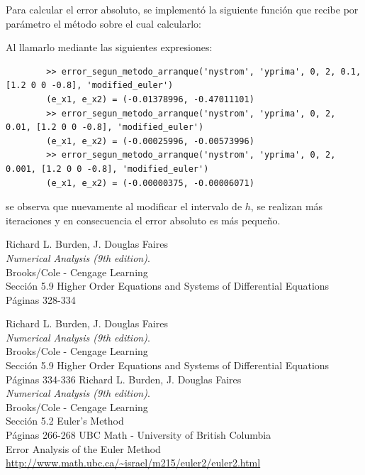 \documentclass[titlepage,a4paper]{article}
\begin{document}
	Para calcular el error absoluto, se implementó la siguiente función que recibe por parámetro el método sobre el cual calcularlo:
	

	Al llamarlo mediante las siguientes expresiones:

	\begin{lstlisting}
		>> error_segun_metodo_arranque('nystrom', 'yprima', 0, 2, 0.1, [1.2 0 0 -0.8], 'modified_euler')
		(e_x1, e_x2) = (-0.01378996, -0.47011101)
		>> error_segun_metodo_arranque('nystrom', 'yprima', 0, 2, 0.01, [1.2 0 0 -0.8], 'modified_euler')
		(e_x1, e_x2) = (-0.00025996, -0.00573996)
		>> error_segun_metodo_arranque('nystrom', 'yprima', 0, 2, 0.001, [1.2 0 0 -0.8], 'modified_euler')
		(e_x1, e_x2) = (-0.00000375, -0.00006071)
	\end{lstlisting}

	se observa que nuevamente al modificar el intervalo de $ h $, se realizan más iteraciones y en consecuencia el error absoluto es más pequeño.


\begin{thebibliography}{9} 
		Richard L. Burden, J. Douglas Faires\\
		\textit{Numerical Analysis (9th edition)}. \\
		Brooks/Cole - Cengage Learning\\
		Sección 5.9 Higher Order Equations and Systems of Differential Equations\\
		Páginas 328-334

		Richard L. Burden, J. Douglas Faires\\
		\textit{Numerical Analysis (9th edition)}.\\ 
		Brooks/Cole - Cengage Learning\\
		Sección 5.9 Higher Order Equations and Systems of Differential Equations\\
		Páginas 334-336
		Richard L. Burden, J. Douglas Faires\\
		\textit{Numerical Analysis (9th edition)}. \\
		Brooks/Cole - Cengage Learning\\
		Sección 5.2 Euler's Method\\
		Páginas 266-268
		UBC Math - University of British Columbia\\
		Error Analysis of the Euler Method\\
		\url{http://www.math.ubc.ca/~israel/m215/euler2/euler2.html}
	 
\end{thebibliography}
\end{document}
